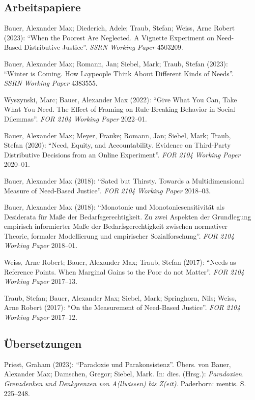 \documentclass[a4paper,10pt]{article}
\newenvironment{literature}{%
   \parskip6pt\parindent0pt\raggedright
   \def\lititem{\hangindent=1cm\hangafter1}}{%
   \par\ignorespaces}
\begin{document}
\subsection*{Arbeitspapiere}
\begin{literature}
\lititem Bauer, Alexander Max; Diederich, Adele; Traub, Stefan; Weiss, Arne Robert (2023): \enquote{When the Poorest Are Neglected. A Vignette Experiment on Need-Based Distributive Justice}. \textit{SSRN Working Paper} 4503209.

\lititem Bauer, Alexander Max; Romann, Jan; Siebel, Mark; Traub, Stefan (2023): \enquote{Winter is Coming. How Laypeople Think About Different Kinds of Needs}. \textit{SSRN Working Paper} 4383555.

\lititem Wyszynski, Marc; Bauer, Alexander Max (2022): \enquote{Give What You Can, Take What You Need. The Effect of Framing on Rule-Breaking Behavior in Social Dilemmas}. \textit{FOR 2104 Working Paper} 2022--01.

\lititem Bauer, Alexander Max; Meyer, Frauke; Romann, Jan; Siebel, Mark; Traub, Stefan (2020): \enquote{Need, Equity, and Accountability. Evidence on Third-Party Distributive Decisions from an Online Experiment}. \textit{FOR 2104 Working Paper} 2020--01.

\lititem Bauer, Alexander Max (2018): \enquote{Sated but Thirsty. Towards a Multidimensional Measure of Need-Based Justice}. \textit{FOR 2104 Working Paper} 2018--03.

\lititem Bauer, Alexander Max (2018): \enquote{Monotonie und Monotoniesensitivität als Desiderata für Maße der Bedarfsgerechtigkeit. Zu zwei Aspekten der Grundlegung empirisch informierter Maße der Bedarfsgerechtigkeit zwischen normativer Theorie, formaler Modellierung und empirischer Sozialforschung}. \textit{FOR 2104 Working Paper} 2018--01.

\lititem Weiss, Arne Robert; Bauer, Alexander Max; Traub, Stefan (2017): \enquote{Needs as Reference Points. When Marginal Gains to the Poor do not Matter}. \textit{FOR 2104 Working Paper} 2017--13.

\lititem Traub, Stefan; Bauer, Alexander Max; Siebel, Mark; Springhorn, Nils; Weiss, Arne Robert (2017): \enquote{On the Measurement of Need-Based Justice}. \textit{FOR 2104 Working Paper} 2017--12.
\end{literature}

\subsection*{Übersetzungen}
\begin{literature}
\lititem Priest, Graham (2023): \enquote{Paradoxie und Parakonsistenz}. Übers. von Bauer, Alexander Max; Damschen, Gregor; Siebel, Mark. In: dies. (Hrsg.): \textit{Paradoxien. Grenzdenken und Denkgrenzen von A(llwissen) bis Z(eit)}. Paderborn: mentis. S. 225--248.
\end{literature}
\end{document}
